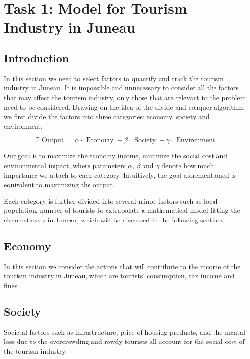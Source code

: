 \section{Task 1: Model for Tourism Industry in Juneau}

\subsection{Introduction}


In this section we need to select factors to quantify and track the tourism industry in Juneau. 
It is impossible and unnecessary to consider all the factors that may affect the 
tourism industry, only those that are relevant to the problem need to be considered.
Drawing on the idea of the divide-and-conquer algorithm, we first divide the factors 
into three categories: economy, society and environment. 


\begin{equation}
    \mathbb{T}\text { Output }=\alpha \cdot \text { Economy }-\beta \cdot \text { Society }-\gamma \cdot \text { Environment }
\end{equation}

Our goal is to maximize the economy income, minimize the social cost and environmental impact,
where parameters $\alpha$, $\beta$ and $\gamma$ denote how much importance we attach to each category.
Intuitively, the goal aforementioned is equivalent to maximizing the output.

Each category is further divided into several minor factors such as local population, 
number of tourists to extrapolate a mathematical model fitting the circumstances in Juneau,
which will be discussed in the following sections.


\subsection{Economy}

In this section we consider the actions that will contribute to the income of the tourism industry in Juneau, which are
tourists' consumption, tax income and fines.


\subsection{Society}

Societal factors such as infrastructure, price of housing products, and the mental
loss due to the overcrowding and rowdy tourists all account for the social cost of the tourism industry.

